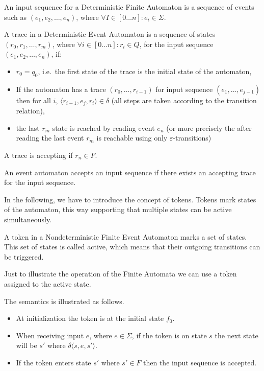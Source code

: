 			\begin{dfn}
				\label{dfn:cep:ea:inputseq}
				An input sequence for a Deterministic Finite Automaton is a sequence of events such as $(e_1, e_2, \dots, e_n )$, where $\forall I \in [0\ldots n] : e_i \in \Sigma$.
			\end{dfn}
		
			\begin{dfn}
				\label{dfn:cep:ea:trace}
				A trace in a Deterministic Event Automaton is
				a sequence of states $(r_0, r_1, \dots, r_m)$, where $\forall i \in [0\ldots n]: r_i \in Q$,
				for the input sequence $(e_1, e_2, \dots, e_n)$, if:
				\begin{itemize}
					\item $r_0 = q_0$, i.e.~the first state of the trace is the initial state of the automaton,
					\item If the automaton has a trace $(r_0,\dots,r_{i-1})$ for input sequence $(e_1,\dots,e_{j-1})$ then for all $i$, $\langle r_{i-1}, e_j, r_i \rangle \in \delta$ (all steps are taken according to the transition relation),
	
				\item the last $r_m$ state is reached by reading event $e_n$ (or more precisely the after reading the last event $r_m$ is reachable using only
					$\varepsilon$-transitions)
				\end{itemize}
				A trace is accepting if $r_n \in F$.
			\end{dfn}
		
			\begin{dfn}
				\label{dfn:cep:ea:accepting}
				An event automaton accepts an input sequence if there exists an accepting trace for the input sequence.
			\end{dfn}
		
In the following, we have to introduce the concept of tokens. Tokens mark states of the automaton, this way supporting that multiple states can be active simultaneously.
			\begin{dfn}
				\label{dfn:cep:ea:token}
				A token in a Nondeterministic Finite Event Automaton marks a set of states. This set of states is called active, which means that their outgoing transitions can be triggered.
			\end{dfn}
			
			Just to illustrate the operation of the Finite Automata we can use a token assigned to the active state.
	
			The semantics is illustrated as follows. 
			\begin{itemize}
				\item At initialization the token is at the initial state $f_0$.
				\item When receiving input $e$, where $e \in \Sigma$, if the token is on state $s$ the next state will be $s'$ where
				$\delta \langle s,e,s' \rangle$.%
				\item If the token enters state $s'$ where $s' \in F$ then the input sequence is accepted. 			
			\end{itemize}
	
